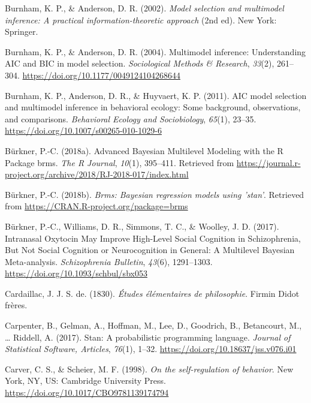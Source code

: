 \documentclass[a4paper,12pt,twoside,onecolumn,openright,final,oldfontcommands]{memoir}
\begin{document}
\leavevmode\hypertarget{ref-burnham_model_2002}{}%
Burnham, K. P., \& Anderson, D. R. (2002). \emph{Model selection and multimodel inference: A practical information-theoretic approach} (2nd ed). New York: Springer.

\leavevmode\hypertarget{ref-burnham_multimodel_2004}{}%
Burnham, K. P., \& Anderson, D. R. (2004). Multimodel inference: Understanding AIC and BIC in model selection. \emph{Sociological Methods \& Research}, \emph{33}(2), 261--304. \url{https://doi.org/10.1177/0049124104268644}

\leavevmode\hypertarget{ref-burnham_aic_2011}{}%
Burnham, K. P., Anderson, D. R., \& Huyvaert, K. P. (2011). AIC model selection and multimodel inference in behavioral ecology: Some background, observations, and comparisons. \emph{Behavioral Ecology and Sociobiology}, \emph{65}(1), 23--35. \url{https://doi.org/10.1007/s00265-010-1029-6}

\leavevmode\hypertarget{ref-burkner_advanced_2018}{}%
Bürkner, P.-C. (2018a). Advanced Bayesian Multilevel Modeling with the R Package brms. \emph{The R Journal}, \emph{10}(1), 395--411. Retrieved from \url{https://journal.r-project.org/archive/2018/RJ-2018-017/index.html}

\leavevmode\hypertarget{ref-R-brms}{}%
Bürkner, P.-C. (2018b). \emph{Brms: Bayesian regression models using 'stan'}. Retrieved from \url{https://CRAN.R-project.org/package=brms}

\leavevmode\hypertarget{ref-burkner_intranasal_2017}{}%
Bürkner, P.-C., Williams, D. R., Simmons, T. C., \& Woolley, J. D. (2017). Intranasal Oxytocin May Improve High-Level Social Cognition in Schizophrenia, But Not Social Cognition or Neurocognition in General: A Multilevel Bayesian Meta-analysis. \emph{Schizophrenia Bulletin}, \emph{43}(6), 1291--1303. \url{https://doi.org/10.1093/schbul/sbx053}

\leavevmode\hypertarget{ref-cardaillac_etudes_1830}{}%
Cardaillac, J. J. S. de. (1830). \emph{Études élémentaires de philosophie}. Firmin Didot frères.

\leavevmode\hypertarget{ref-carpenter_stan_2017}{}%
Carpenter, B., Gelman, A., Hoffman, M., Lee, D., Goodrich, B., Betancourt, M., \ldots{} Riddell, A. (2017). Stan: A probabilistic programming language. \emph{Journal of Statistical Software, Articles}, \emph{76}(1), 1--32. \url{https://doi.org/10.18637/jss.v076.i01}

\leavevmode\hypertarget{ref-carver_self-regulation_1998}{}%
Carver, C. S., \& Scheier, M. F. (1998). \emph{On the self-regulation of behavior}. New York, NY, US: Cambridge University Press. \url{https://doi.org/10.1017/CBO9781139174794}
\end{document}
